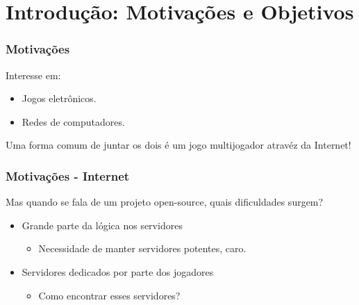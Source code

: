 \documentclass[brazil]{beamer}
\begin{document}
\section{Introdução: Motivações e Objetivos}
\begin{frame}[fragile]
  \frametitle{Motivações}
  Interesse em:
  \begin{itemize}
    \item Jogos eletrônicos.
    \item Redes de computadores.
  \end{itemize}
  \pause
  \vspace{30pt}
  Uma forma comum de juntar os dois é um jogo multijogador atravéz da Internet!
\end{frame}
\begin{frame}[fragile]
  \frametitle{Motivações - Internet}
  Mas quando se fala de um projeto open-source, quais dificuldades surgem?
  \pause
  \vspace{10pt}
  \begin{itemize}
    \item Grande parte da lógica nos servidores
        \pause
        \begin{itemize} \item Necessidade de manter servidores potentes, caro. \end{itemize}
    \pause
    \vspace{10pt}
    \item Servidores dedicados por parte dos jogadores
        \pause
        \begin{itemize} \item Como encontrar esses servidores? \end{itemize}
  \end{itemize}

\end{frame}
\end{document}
